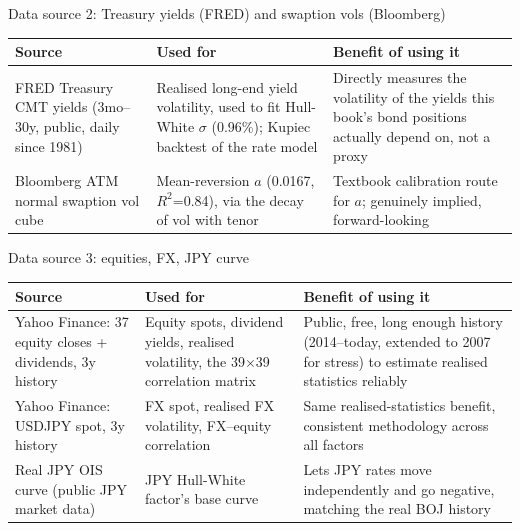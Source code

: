 \documentclass[8pt,aspectratio=169]{beamer}
\begin{document}
\begin{frame}{Data source 2: Treasury yields (FRED) and swaption vols (Bloomberg)}
  \small
  \begin{tabular}{p{}p{}p{}}
    \toprule
    \textbf{Source} & \textbf{Used for} & \textbf{Benefit of using it} \\
    \midrule
    FRED Treasury CMT yields (3mo--30y, public, daily since 1981) & Realised long-end yield volatility, used to fit Hull-White $\sigma$ (0.96\%); Kupiec backtest of the rate model & Directly measures the volatility of the yields this book's bond positions actually depend on, not a proxy \\
    Bloomberg ATM normal swaption vol cube & Mean-reversion $a$ (0.0167, $R^2$=0.84), via the decay of vol with tenor & Textbook calibration route for $a$; genuinely implied, forward-looking \\
    \bottomrule
  \end{tabular}
\end{frame}

\begin{frame}{Data source 3: equities, FX, JPY curve}
  \small
  \begin{tabular}{p{}p{}p{}}
    \toprule
    \textbf{Source} & \textbf{Used for} & \textbf{Benefit of using it} \\
    \midrule
    Yahoo Finance: 37 equity closes + dividends, 3y history & Equity spots, dividend yields, realised volatility, the 39$\times$39 correlation matrix & Public, free, long enough history (2014--today, extended to 2007 for stress) to estimate realised statistics reliably \\
    Yahoo Finance: USDJPY spot, 3y history & FX spot, realised FX volatility, FX--equity correlation & Same realised-statistics benefit, consistent methodology across all factors \\
    Real JPY OIS curve (public JPY market data) & JPY Hull-White factor's base curve & Lets JPY rates move independently and go negative, matching the real BOJ history \\
    \bottomrule
  \end{tabular}
\end{frame}
\end{document}
